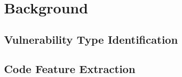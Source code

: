 \section{Background}

\subsection{Vulnerability Type Identification}


\subsection{Code Feature Extraction}